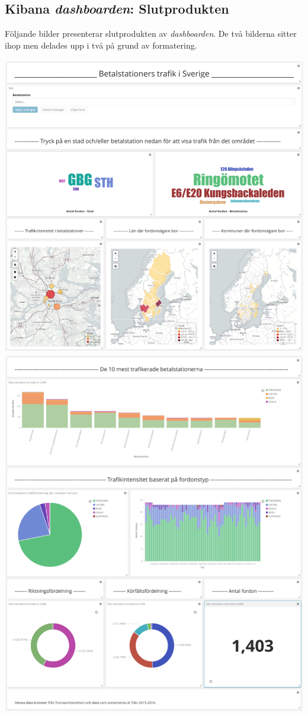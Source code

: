\documentclass[12pt]{kththesis}
\begin{document}
\begin{appendices}
\section{Kibana \textit{dashboarden}: Slutprodukten}
Följande bilder presenterar slutprodukten av \textit{dashboarden}. De två bilderna sitter ihop men delades upp i två på grund av formatering.

\includegraphics[width=1\textwidth]{Dashboard1}
\newpage
\includegraphics[width=1\textwidth]{Dashboard2}
\newpage


\end{appendices}
\end{document}

